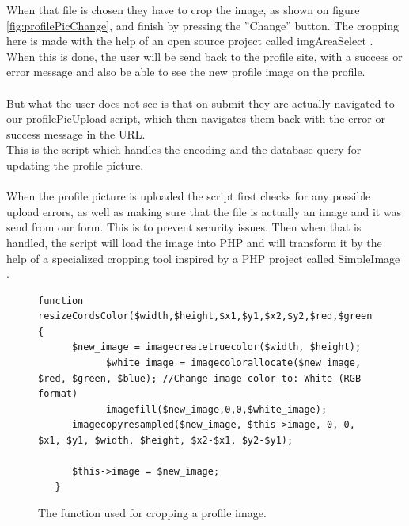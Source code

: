 When that file is chosen they have to crop the image, as shown on figure \ref{fig:profilePicChange}, and finish by pressing the ''Change'' button.
The cropping here is made with the help of an open source project called imgAreaSelect \citep{imgAreaSelect}.\\
When this is done, the user will be send back to the profile site, with a success or error message and also be able to see the new profile image on the profile.\\
\\
But what the user does not see is that on submit they are actually navigated to our profilePicUpload script, which then navigates them back with the error or success message in the URL.\\
This is the script which handles the encoding and the database query for updating the profile picture.\\
\\
When the profile picture is uploaded the script first checks for any possible upload errors, as well as making sure that the file is actually an image and it was send from our form. This is to prevent security issues.
Then when that is handled, the script will load the image into PHP and will transform it by the help of a specialized cropping tool inspired by a PHP project called SimpleImage \citep{simpleimage}.
\lstset{language=PHP}
\begin{figure}[htbp]
\begin{lstlisting}[firstline=1]
   function resizeCordsColor($width,$height,$x1,$y1,$x2,$y2,$red,$green,$blue) {
      $new_image = imagecreatetruecolor($width, $height);
			$white_image = imagecolorallocate($new_image, $red, $green, $blue); //Change image color to: White (RGB format)
			imagefill($new_image,0,0,$white_image);
      imagecopyresampled($new_image, $this->image, 0, 0, $x1, $y1, $width, $height, $x2-$x1, $y2-$y1);
	  
      $this->image = $new_image;
   }
\end{lstlisting}
\caption{The function used for cropping a profile image.}
\label{lst:croppingProfile}
\end{figure}

